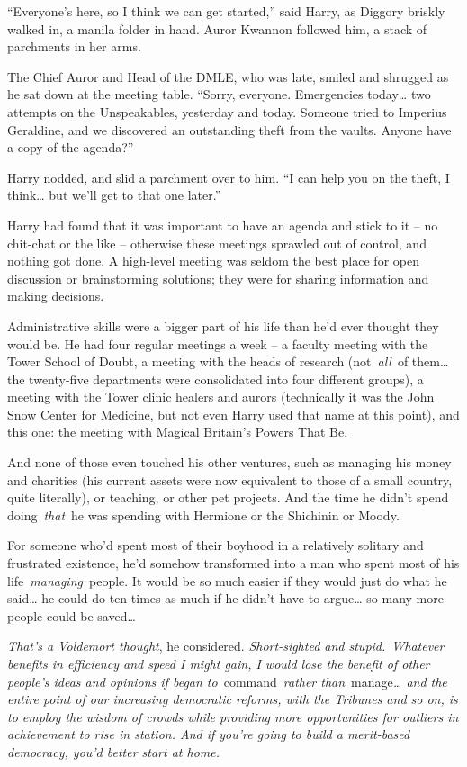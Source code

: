 \mybreak

``Everyone's here, so I think we can get started,'' said Harry, as
Diggory briskly walked in, a manila folder in hand. Auror Kwannon
followed him, a stack of parchments in her arms.

The Chief Auror and Head of the DMLE, who was late, smiled and shrugged
as he sat down at the meeting table. ``Sorry, everyone. Emergencies
today\ldots{} two attempts on the Unspeakables, yesterday and today.
Someone tried to Imperius Geraldine, and we discovered an outstanding
theft from the vaults. Anyone have a copy of the agenda?''

Harry nodded, and slid a parchment over to him. ``I can help you on the
theft, I think\ldots{} but we'll get to that one later.''

Harry had found that it was important to have an agenda and stick to it
-- no chit-chat or the like -- otherwise these meetings sprawled out of
control, and nothing got done. A high-level meeting was seldom the best
place for open discussion or brainstorming solutions; they were for
sharing information and making decisions.

Administrative skills were a bigger part of his life than he'd ever
thought they would be. He had four regular meetings a week -- a faculty
meeting with the Tower School of Doubt, a meeting with the heads of
research (not~\emph{all}~of them\ldots{} the twenty-five departments
were consolidated into four different groups), a meeting with the Tower
clinic healers and aurors (technically it was the John Snow Center for
Medicine, but not even Harry used that name at this point), and this
one: the meeting with Magical Britain's Powers That Be.

And none of those even touched his other ventures, such as managing his
money and charities (his current assets were now equivalent to those of
a small country, quite literally), or teaching, or other pet projects.
And the time he didn't spend doing~\emph{that}~he was spending with
Hermione or the Shichinin or Moody.

For someone who'd spent most of their boyhood in a relatively solitary
and frustrated existence, he'd somehow transformed into a man who spent
most of his life~\emph{managing}~people. It would be so much easier if
they would just do what he said\ldots{} he could do ten times as much if
he didn't have to argue\ldots{} so many more people could be
saved\ldots{}

\emph{That's a Voldemort thought}, he considered. \emph{Short-sighted
and stupid.}~\emph{Whatever benefits in efficiency and speed I might
gain, I would lose the benefit of other people's ideas and opinions if
began to}~command~\emph{rather than}~manage\emph{\ldots{} and the entire
point of our increasing democratic reforms, with the Tribunes and so on,
is to employ the wisdom of crowds while providing more opportunities for
outliers in achievement to rise in station. And if you're going to build
a merit-based democracy, you'd better start at home.}


